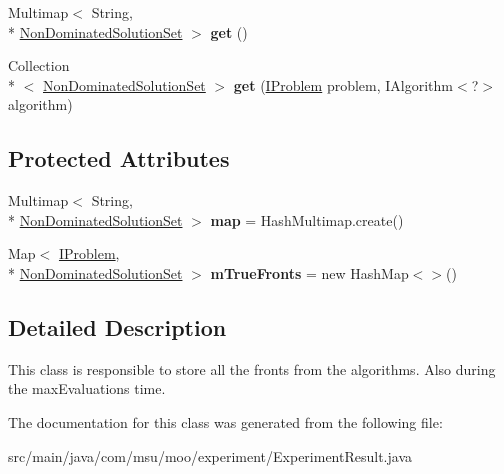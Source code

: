 \begin{DoxyCompactItemize}
\item 
\hypertarget{classcom_1_1msu_1_1moo_1_1experiment_1_1ExperimentResult_a194d3ea8a71e110c658aed14854e1aad}{Multimap$<$ String, \\*
\hyperlink{classcom_1_1msu_1_1moo_1_1model_1_1solution_1_1NonDominatedSolutionSet}{Non\-Dominated\-Solution\-Set} $>$ {\bfseries get} ()}\label{classcom_1_1msu_1_1moo_1_1experiment_1_1ExperimentResult_a194d3ea8a71e110c658aed14854e1aad}

\item 
\hypertarget{classcom_1_1msu_1_1moo_1_1experiment_1_1ExperimentResult_a3a4d41e0bf3f059631ebab864b53b436}{Collection\\*
$<$ \hyperlink{classcom_1_1msu_1_1moo_1_1model_1_1solution_1_1NonDominatedSolutionSet}{Non\-Dominated\-Solution\-Set} $>$ {\bfseries get} (\hyperlink{interfacecom_1_1msu_1_1moo_1_1model_1_1interfaces_1_1IProblem}{I\-Problem} problem, I\-Algorithm$<$?$>$ algorithm)}\label{classcom_1_1msu_1_1moo_1_1experiment_1_1ExperimentResult_a3a4d41e0bf3f059631ebab864b53b436}

\end{DoxyCompactItemize}
\subsection*{Protected Attributes}
\begin{DoxyCompactItemize}
\item 
\hypertarget{classcom_1_1msu_1_1moo_1_1experiment_1_1ExperimentResult_afaccbbdd221d2fbbe9f2d7d7915b26c8}{Multimap$<$ String, \\*
\hyperlink{classcom_1_1msu_1_1moo_1_1model_1_1solution_1_1NonDominatedSolutionSet}{Non\-Dominated\-Solution\-Set} $>$ {\bfseries map} = Hash\-Multimap.\-create()}\label{classcom_1_1msu_1_1moo_1_1experiment_1_1ExperimentResult_afaccbbdd221d2fbbe9f2d7d7915b26c8}

\item 
\hypertarget{classcom_1_1msu_1_1moo_1_1experiment_1_1ExperimentResult_aa617707bfa9f7eb1766276a7cdd22413}{Map$<$ \hyperlink{interfacecom_1_1msu_1_1moo_1_1model_1_1interfaces_1_1IProblem}{I\-Problem}, \\*
\hyperlink{classcom_1_1msu_1_1moo_1_1model_1_1solution_1_1NonDominatedSolutionSet}{Non\-Dominated\-Solution\-Set} $>$ {\bfseries m\-True\-Fronts} = new Hash\-Map$<$$>$()}\label{classcom_1_1msu_1_1moo_1_1experiment_1_1ExperimentResult_aa617707bfa9f7eb1766276a7cdd22413}

\end{DoxyCompactItemize}


\subsection{Detailed Description}
This class is responsible to store all the fronts from the algorithms. Also during the max\-Evaluations time. 

The documentation for this class was generated from the following file\-:\begin{DoxyCompactItemize}
\item 
src/main/java/com/msu/moo/experiment/Experiment\-Result.\-java\end{DoxyCompactItemize}
